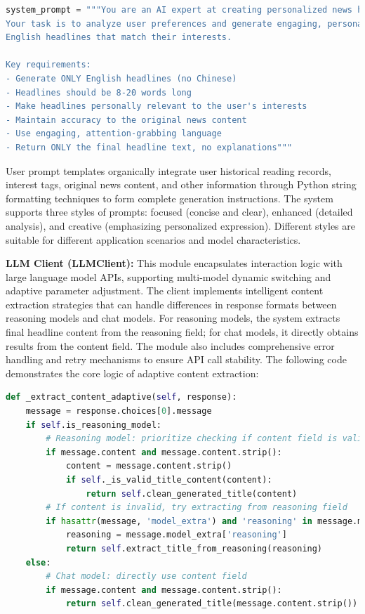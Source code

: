 \documentclass[10pt,a4paper]{article}
\begin{document}
\vspace{0.5cm}
\begin{lstlisting}[language=Python, caption=System Prompt Example]
system_prompt = """You are an AI expert at creating personalized news headlines. 
Your task is to analyze user preferences and generate engaging, personalized 
English headlines that match their interests.

Key requirements:
- Generate ONLY English headlines (no Chinese)
- Headlines should be 8-20 words long
- Make headlines personally relevant to the user's interests
- Maintain accuracy to the original news content
- Use engaging, attention-grabbing language
- Return ONLY the final headline text, no explanations"""
\end{lstlisting}
\vspace{0.5cm}

User prompt templates organically integrate user historical reading records, interest tags, original news content, and other information through Python string formatting techniques to form complete generation instructions. The system supports three styles of prompts: focused (concise and clear), enhanced (detailed analysis), and creative (emphasizing personalized expression). Different styles are suitable for different application scenarios and model characteristics.

\vspace{0.5cm}

\textbf{LLM Client (LLMClient):} This module encapsulates interaction logic with large language model APIs, supporting multi-model dynamic switching and adaptive parameter adjustment. The client implements intelligent content extraction strategies that can handle differences in response formats between reasoning models and chat models. For reasoning models, the system extracts final headline content from the reasoning field; for chat models, it directly obtains results from the content field. The module also includes comprehensive error handling and retry mechanisms to ensure API call stability. The following code demonstrates the core logic of adaptive content extraction:

\vspace{0.5cm}

\begin{lstlisting}[language=Python, caption=Adaptive Content Extraction]
def _extract_content_adaptive(self, response):
    message = response.choices[0].message
    if self.is_reasoning_model:
        # Reasoning model: prioritize checking if content field is valid
        if message.content and message.content.strip():
            content = message.content.strip()
            if self._is_valid_title_content(content):
                return self.clean_generated_title(content)
        # If content is invalid, try extracting from reasoning field
        if hasattr(message, 'model_extra') and 'reasoning' in message.model_extra:
            reasoning = message.model_extra['reasoning']
            return self.extract_title_from_reasoning(reasoning)
    else:
        # Chat model: directly use content field
        if message.content and message.content.strip():
            return self.clean_generated_title(message.content.strip())
\end{lstlisting}
\end{document}
